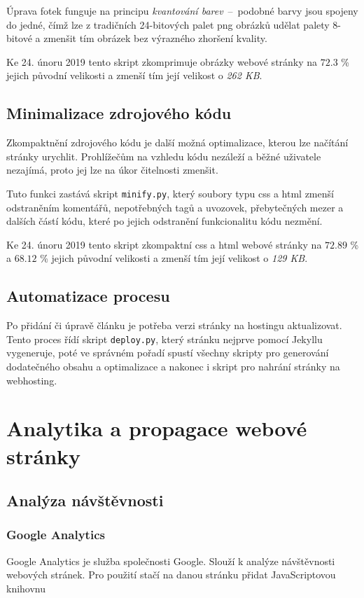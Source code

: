 \documentclass[a4paper, 12pt]{article}
\begin{document}
  Úprava fotek funguje na principu \emph{kvantování barev}~--~podobné barvy jsou spojeny do jedné, čímž lze z tradičních 24-bitových palet \gls{png} obrázků udělat palety 8-bitové a zmenšit tím obrázek bez výrazného zhoršení kvality.

  Ke 24. únoru 2019 tento skript zkomprimuje obrázky webové stránky na $72.3$ \% jejich původní velikosti a zmenší tím její velikost o \emph{262 KB}.


  \subsection{Minimalizace zdrojového kódu}
  Zkompaktnění zdrojového kódu je další možná optimalizace, kterou lze načítání stránky urychlit. Prohlížečům na vzhledu kódu nezáleží a běžné uživatele nezajímá, proto jej lze na úkor čitelnosti zmenšit.

  Tuto funkci zastává skript \texttt{minify.py}, který soubory typu \gls{css} a \gls{html} zmenší odstraněním komentářů, nepotřebných tagů a uvozovek, přebytečných mezer a dalších částí kódu, které po jejich odstranění funkcionalitu kódu nezmění.

  Ke 24. únoru 2019 tento skript zkompaktní \gls{css} a \gls{html} webové stránky na $72.89$ \% a $68.12$ \% jejich původní velikosti a zmenší tím její velikost o \emph{129 KB}.


  \subsection{Automatizace procesu}
  Po přidání či úpravě článku je potřeba verzi stránky na hostingu aktualizovat. Tento proces řídí skript \texttt{deploy.py}, který stránku nejprve pomocí Jekyllu vygeneruje, poté ve správném pořadí spustí všechny skripty pro generování dodatečného obsahu a optimalizace a nakonec i skript pro nahrání stránky na webhosting.


  \section{Analytika a propagace webové stránky}

  \subsection{Analýza návštěvnosti}

  \subsubsection{Google Analytics}
  Google Analytics je služba společnosti Google. Slouží k analýze návštěvnosti webových stránek. Pro použití stačí na danou stránku přidat JavaScriptovou knihovnu %
\end{document}
